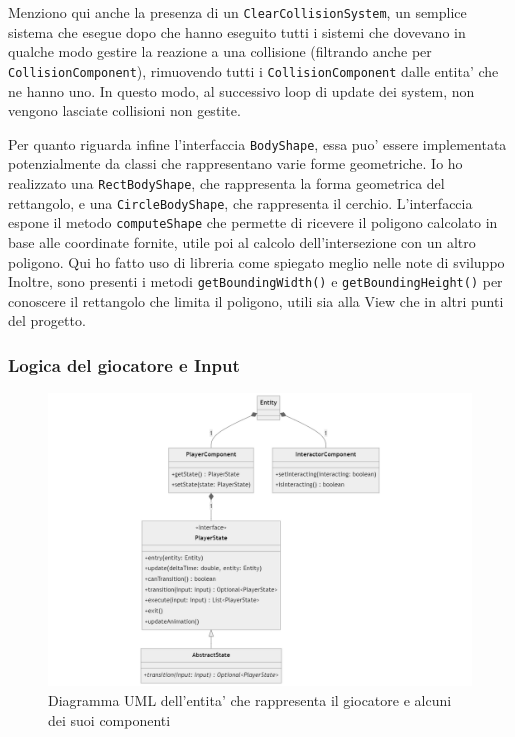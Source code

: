 \documentclass[a4paper,12pt]{report}
\begin{document}
Menziono qui anche la presenza di un \texttt{ClearCollisionSystem}, un semplice sistema che esegue dopo che hanno eseguito tutti i sistemi che dovevano in qualche modo gestire la reazione a una collisione (filtrando anche per \texttt{CollisionComponent}), rimuovendo tutti i \texttt{CollisionComponent} dalle entita' che ne hanno uno. In questo modo, al successivo loop di update dei system, non vengono lasciate collisioni non gestite.

Per quanto riguarda infine l'interfaccia \texttt{BodyShape}, essa puo' essere implementata potenzialmente da classi che rappresentano varie forme geometriche. Io ho realizzato una \texttt{RectBodyShape}, che rappresenta la forma geometrica del rettangolo, e una \texttt{CircleBodyShape}, che rappresenta il cerchio. L'interfaccia espone il metodo \texttt{computeShape} che permette di ricevere il poligono calcolato in base alle coordinate fornite, utile poi al calcolo dell'intersezione con un altro poligono. Qui ho fatto uso di libreria come spiegato meglio nelle note di sviluppo Inoltre, sono presenti i metodi \texttt{getBoundingWidth()} e \texttt{getBoundingHeight()} per conoscere il rettangolo che limita il poligono, utili sia alla View che in altri punti del progetto.

\newpage

\subsubsection{Logica del giocatore e Input}

\begin{figure}[h]
	\centering
	\includegraphics[width=\textwidth]{uml/uml_player.png}
	\caption{Diagramma UML dell'entita' che rappresenta il giocatore e alcuni dei suoi componenti}
\end{figure}
\end{document}
